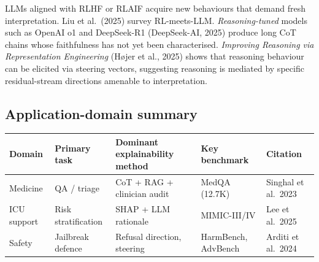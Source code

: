 LLMs aligned with RLHF or RLAIF acquire new behaviours that demand fresh interpretation. Liu et al.~(2025) survey RL-meets-LLM. \emph{Reasoning-tuned} models such as OpenAI o1 and DeepSeek-R1 (DeepSeek-AI, 2025) produce long CoT chains whose faithfulness has not yet been characterised. \emph{Improving Reasoning via Representation Engineering} (Højer et al., 2025) shows that reasoning behaviour can be elicited via steering vectors, suggesting reasoning is mediated by specific residual-stream directions amenable to interpretation.

\subsection{Application-domain summary}\label{application-domain-summary}

{\def\LTcaptype{none} %
\begin{longtable}[]{@{}
  >{\raggedright\arraybackslash}p{}
  >{\raggedright\arraybackslash}p{}
  >{\raggedright\arraybackslash}p{}
  >{\raggedright\arraybackslash}p{}
  >{\raggedright\arraybackslash}p{}@{}}
\toprule\noalign{}
\begin{minipage}[b]{\linewidth}\raggedright
Domain
\end{minipage} & \begin{minipage}[b]{\linewidth}\raggedright
Primary task
\end{minipage} & \begin{minipage}[b]{\linewidth}\raggedright
Dominant explainability method
\end{minipage} & \begin{minipage}[b]{\linewidth}\raggedright
Key benchmark
\end{minipage} & \begin{minipage}[b]{\linewidth}\raggedright
Citation
\end{minipage} \\
\midrule\noalign{}
\endhead
\bottomrule\noalign{}
\endlastfoot
Medicine & QA / triage & CoT + RAG + clinician audit & MedQA (12.7K) & Singhal et al.~2023 \\
ICU support & Risk stratification & SHAP + LLM rationale & MIMIC-III/IV & Lee et al.~2025 \\
Safety & Jailbreak defence & Refusal direction, steering & HarmBench, AdvBench & Arditi et al.~2024 \\

\end{longtable}}
